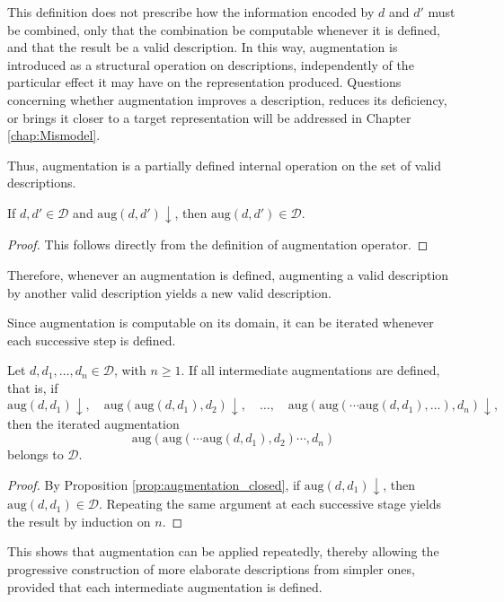 This definition does not prescribe how the information encoded by $d$ and $d'$ must be combined, only that the combination be computable whenever it is defined, and that the result be a valid description. In this way, augmentation is introduced as a structural operation on descriptions, independently of the particular effect it may have on the representation produced. Questions concerning whether augmentation improves a description, reduces its deficiency, or brings it closer to a target representation will be addressed in Chapter \ref{chap:Mismodel}.

Thus, augmentation is a partially defined internal operation on the set of valid descriptions.

\begin{proposition}
\label{prop:augmentation_closed}
If $d, d' \in \mathcal{D}$ and $\mathrm{aug}(d,d')\downarrow$, then $\mathrm{aug}(d,d') \in \mathcal{D}$.
\end{proposition}
\begin{proof}
This follows directly from the definition of augmentation operator.
\end{proof}

Therefore, whenever an augmentation is defined, augmenting a valid description by another valid description yields a new valid description.

Since augmentation is computable on its domain, it can be iterated whenever each successive step is defined.

\begin{proposition}
Let $d, d_1, \ldots, d_n \in \mathcal{D}$, with $n \geq 1$. If all intermediate augmentations are defined, that is, if
\[
\mathrm{aug}(d,d_1)\downarrow,\quad
\mathrm{aug}(\mathrm{aug}(d,d_1),d_2)\downarrow,\quad \ldots,\quad
\mathrm{aug}(\mathrm{aug}(\cdots \mathrm{aug}(d,d_1),\ldots),d_n)\downarrow,
\]
then the iterated augmentation
\[
\mathrm{aug}(\mathrm{aug}(\cdots \mathrm{aug}(d,d_1),d_2)\cdots,d_n)
\]
belongs to \(\mathcal{D}\).
\end{proposition}
\begin{proof}
By Proposition \ref{prop:augmentation_closed}, if $\mathrm{aug}(d, d_1)\downarrow$, then $\mathrm{aug}(d, d_1) \in \mathcal{D}$. Repeating the same argument at each successive stage yields the result by induction on \(n\).
\end{proof}

This shows that augmentation can be applied repeatedly, thereby allowing the progressive construction of more elaborate descriptions from simpler ones, provided that each intermediate augmentation is defined.

